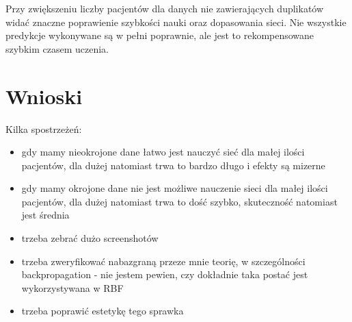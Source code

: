 \documentclass[12pt]{article}
\begin{document}
Przy zwiększeniu liczby pacjentów dla danych nie zawierających duplikatów widać znaczne poprawienie szybkości nauki oraz dopasowania sieci. Nie wszystkie predykcje wykonywane są w pełni poprawnie, ale jest to rekompensowane szybkim czasem uczenia.


\newpage
\section{Wnioski}

Kilka spostrzeżeń:

\begin{itemize}
\item gdy mamy nieokrojone dane łatwo jest nauczyć sieć dla małej ilości pacjentów, dla dużej natomiast trwa to bardzo długo i efekty są mizerne
\item gdy mamy okrojone dane nie jest możliwe nauczenie sieci dla małej ilości pacjentów, dla dużej natomiast trwa to dość szybko, skuteczność natomiast jest średnia
\item trzeba zebrać dużo screenshotów
\item trzeba zweryfikować nabazgraną przeze mnie teorię, w szczególności backpropagation - nie jestem pewien, czy dokładnie taka postać jest wykorzystywana w RBF
\item trzeba poprawić estetykę tego sprawka
\end{itemize}
\end{document}
